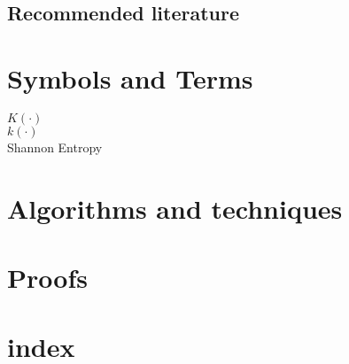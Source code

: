 \documentclass{thesis}
\theoremstyle{definition}
\begin{document}
\section{Recommended literature}

\chapter{Symbols and Terms}

\begin{description}
 \item[$K(\cdot)$]
 \item[$k(\cdot)$]
 \item[Shannon Entropy]
\end{description}

\chapter{Algorithms and techniques}
\chapter{Proofs}
\chapter{index}
\printindex
\end{document}
